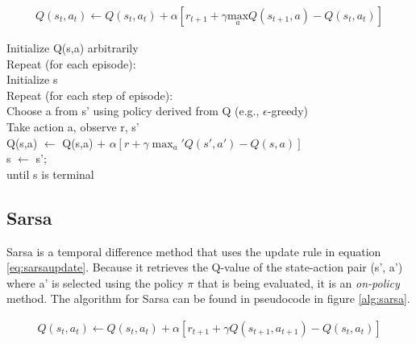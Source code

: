 \documentclass{article}
\newcommand{\tab}{\hspace{10mm}}
\newcommand{\dtab}{\hspace{20mm}}
\begin{document}
\begin{mdframed}
\begin{align}
Q(s_t, a_t) \leftarrow Q(s_t,a_t) + \alpha \left[ r_{t+1} + \gamma \underset{a}{\text{max}} Q(s_{t+1},a) - Q(s_t,a_t)\right]\label{eq:qupdate}
\end{align}
\end{mdframed}


\begin{center} 
\begin{mdframed}
\begin{algorithm}[H]
Initialize Q(s,a) arbitrarily \\
Repeat (for each episode):\\
\tab Initialize s \\
\tab Repeat (for each step of episode):\\
\dtab Choose a from s' using policy derived from Q (e.g., $\epsilon$-greedy)\\
\dtab Take action a, observe r, s'\\
\dtab Q(s,a) $\leftarrow$ Q(s,a) + $\alpha [ r + \gamma \max_a' Q(s', a') - Q(s, a) ]$  \\
\dtab s $\leftarrow$ s'; \\
\tab until s is terminal\\
\end{algorithm}
\end{mdframed}
\label{alg:qlearning}
\end{center}



\subsection{Sarsa}
Sarsa is a temporal difference method that uses the update rule in equation \ref{eq:sarsaupdate}. Because it retrieves the Q-value of the state-action pair (s', a') where a' is selected using the policy $\pi$ that is being evaluated, it is an \textit{on-policy} method. The algorithm for Sarsa can be found in pseudocode in figure \ref{alg:sarsa}.
\begin{mdframed}
\begin{align}
Q(s_t, a_t) \leftarrow Q(s_t,a_t) + \alpha \left[ r_{t+1} + \gamma Q(s_{t+1},a_{t+1}) - Q(s_t,a_t)\right]\label{eq:sarsaupdate}
\end{align}
\end{mdframed}
\end{document}
